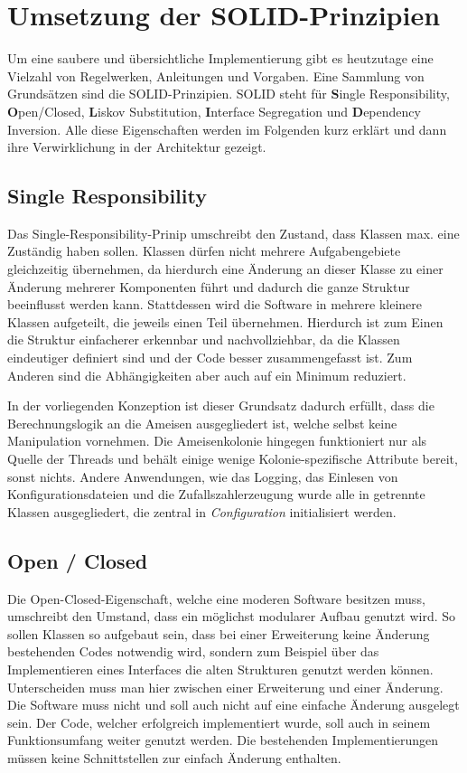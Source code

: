 \section{Umsetzung der SOLID-Prinzipien}{
	Um eine saubere und übersichtliche Implementierung gibt es heutzutage eine Vielzahl von Regelwerken, Anleitungen und Vorgaben. Eine Sammlung von Grundsätzen sind die SOLID-Prinzipien. SOLID steht für \textbf{S}ingle Responsibility, \textbf{O}pen/Closed, \textbf{L}iskov Substitution, \textbf{I}nterface Segregation und \textbf{D}ependency Inversion.
	Alle diese Eigenschaften werden im Folgenden kurz erklärt und dann ihre Verwirklichung in der Architektur gezeigt.
	
	\subsection{Single Responsibility}
	Das Single-Responsibility-Prinip umschreibt den Zustand, dass Klassen max. eine Zuständig haben sollen. Klassen dürfen nicht mehrere Aufgabengebiete gleichzeitig übernehmen, da hierdurch eine Änderung an dieser Klasse zu einer Änderung mehrerer Komponenten führt und dadurch die ganze Struktur beeinflusst werden kann.
	Stattdessen wird die Software in mehrere kleinere Klassen aufgeteilt, die jeweils einen Teil übernehmen. Hierdurch ist zum Einen die Struktur einfacherer erkennbar und nachvollziehbar, da die Klassen eindeutiger definiert sind und der Code besser zusammengefasst ist. Zum Anderen sind die Abhängigkeiten aber auch auf ein Minimum reduziert.
	
	In der vorliegenden Konzeption ist dieser Grundsatz dadurch erfüllt, dass die Berechnungslogik an die Ameisen ausgegliedert ist, welche selbst keine Manipulation vornehmen. Die Ameisenkolonie hingegen funktioniert nur als Quelle der Threads und behält einige wenige Kolonie-spezifische Attribute bereit, sonst nichts.
	Andere Anwendungen, wie das Logging, das Einlesen von Konfigurationsdateien und die Zufallszahlerzeugung wurde alle in getrennte Klassen ausgegliedert, die zentral in \textit{Configuration} initialisiert werden.
	
	\subsection{Open / Closed}
	Die Open-Closed-Eigenschaft, welche eine moderen Software besitzen muss, umschreibt den Umstand, dass ein möglichst modularer Aufbau genutzt wird. So sollen Klassen so aufgebaut sein, dass bei einer Erweiterung keine Änderung bestehenden Codes notwendig wird, sondern zum Beispiel über das Implementieren eines Interfaces die alten Strukturen genutzt werden können.
	Unterscheiden muss man hier zwischen einer Erweiterung und einer Änderung. Die Software muss nicht und soll auch nicht auf eine einfache Änderung ausgelegt sein. Der Code, welcher erfolgreich implementiert wurde, soll auch in seinem Funktionsumfang weiter genutzt werden. Die bestehenden Implementierungen müssen keine Schnittstellen zur einfach Änderung enthalten.
	
}
